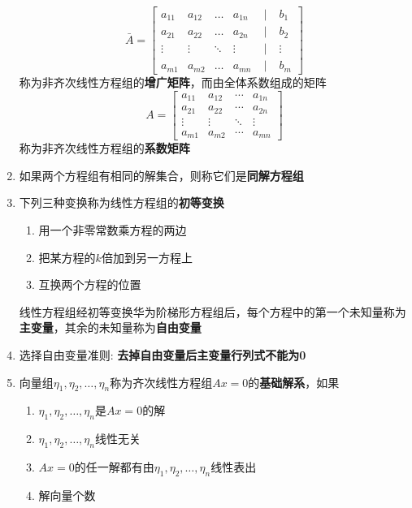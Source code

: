 \documentclass[a4paper,12pt]{article}
\begin{document}
\begin{enumerate}
\[            \bar{A} =
            \begin{bmatrix}
                a_{11} & a_{12} & \dots  & a_{1n} & \;\big|\; & b_1    \\
                a_{21} & a_{22} & \dots  & a_{2n} & \;\big|\; & b_2    \\
                \vdots & \vdots & \ddots & \vdots & \;\big|\; & \vdots \\
                a_{m1} & a_{m2} & \dots  & a_{mn} & \;\big|\; & b_m
            \end{bmatrix}
        \]
        称为非齐次线性方程组的\textbf{增广矩阵}，而由全体系数组成的矩阵
        \[
            A =
            \begin{bmatrix}
                a_{11} & a_{12} & \cdots & a_{1n} \\
                a_{21} & a_{22} & \cdots & a_{2n} \\
                \vdots & \vdots & \ddots & \vdots \\
                a_{m1} & a_{m2} & \cdots & a_{mn}
            \end{bmatrix}
        \]
        称为非齐次线性方程组的\textbf{系数矩阵}
        \item 如果两个方程组有相同的解集合，则称它们是\textbf{同解方程组}
        \item 下列三种变换称为线性方程组的\textbf{初等变换}
        \begin{enumerate}
            \item 用一个非零常数乘方程的两边
            \item 把某方程的$k$倍加到另一方程上
            \item 互换两个方程的位置
        \end{enumerate}
        线性方程组经初等变换华为阶梯形方程组后，每个方程中的第一个未知量\textbf{\color{red}{通常}}称为\textbf{主变量}，其余的未知量称为\textbf{自由变量}
        \item 选择自由变量准则: \textbf{去掉自由变量后主变量行列式不能为0}
        \item 向量组$\eta_1, \eta_2, \dots, \eta_n$称为齐次线性方程组$Ax = 0$的\textbf{基础解系}，如果
        \begin{enumerate}
            \item $\eta_1, \eta_2, \dots, \eta_n$是$Ax = 0$的解
            \item $\eta_1, \eta_2, \dots, \eta_n$线性无关
            \item $Ax = 0$的任一解都有由$\eta_1, \eta_2, \dots, \eta_n$线性表出
            \item 解向量个数

\end{enumerate}
\end{enumerate}
\end{document}
